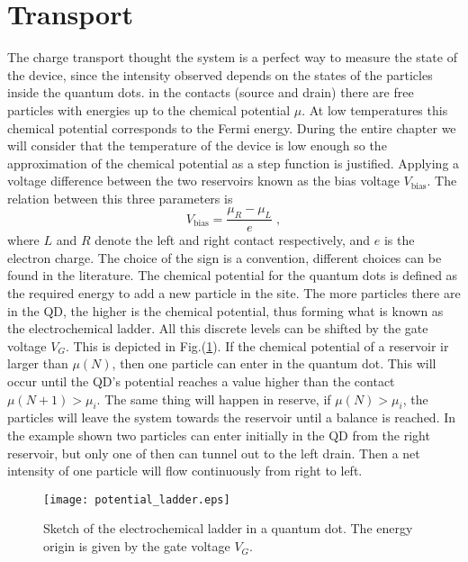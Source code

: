 \section{Transport}
The charge transport thought the system is a perfect way to measure the state of the device, since the intensity observed depends on the states of the particles inside the quantum dots. in the contacts (source and drain) there are free particles with energies up to the chemical potential $\mu$. At low temperatures this chemical potential corresponds to the Fermi energy. During the entire chapter we will consider that the temperature of the device is low enough so the approximation of the chemical potential as a step function is justified. Applying a voltage difference between the two reservoirs known as the bias voltage $V_{\text{bias}}$. The relation between this three parameters is
\begin{equation}
	V_{\text{bias}}=\frac{\mu_R-\mu_L}{e}\; ,
\end{equation}
where $L$ and $R$ denote the left and right contact respectively, and $e$ is the electron charge. The choice of the sign is a convention, different choices can be found in the literature. The chemical potential for the quantum dots is defined as the required energy to add a new particle in the site. The more particles there are in the QD, the higher is the chemical potential, thus forming what is known as the electrochemical ladder. All this discrete levels can be shifted by the gate voltage $V_G$. This is depicted in Fig.(\ref{fig:potential_ladder}). If the chemical potential of a reservoir ir larger than $\mu(N)$, then one particle can enter in the quantum dot. This will occur until the QD's potential reaches a value higher than the contact $\mu(N+1)>\mu_i$. The same thing will happen in reserve, if $\mu(N)>\mu_i$, the particles will leave the system towards the reservoir until a balance is reached. In the example shown two particles can enter initially in the QD from the right reservoir, but only one of then can tunnel out to the left drain. Then a net intensity of one particle will flow continuously from right to left.
\begin{figure}[!htbp]
	\centering
	\texttt{[image: potential\_ladder.eps]}
	\caption{Sketch of the electrochemical ladder in a quantum dot. The energy origin is given by the gate voltage $V_G$.}
	\label{fig:potential_ladder}
\end{figure}

